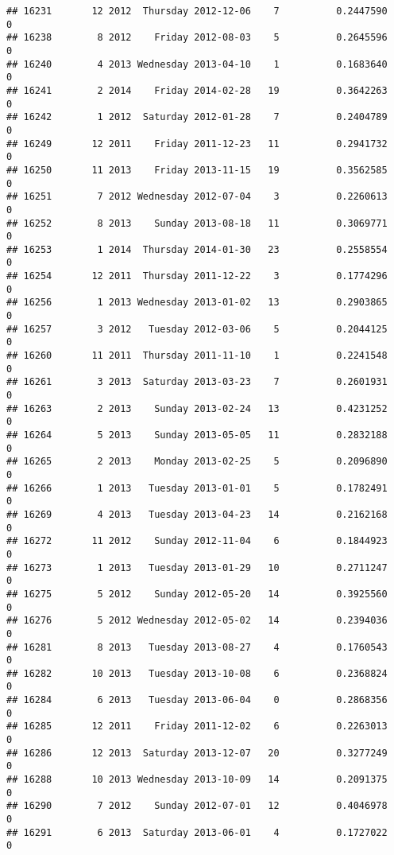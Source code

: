 \documentclass[
]{article}
\begin{document}
\begin{verbatim}
## 16231       12 2012  Thursday 2012-12-06    7          0.2447590             0
## 16238        8 2012    Friday 2012-08-03    5          0.2645596             0
## 16240        4 2013 Wednesday 2013-04-10    1          0.1683640             0
## 16241        2 2014    Friday 2014-02-28   19          0.3642263             0
## 16242        1 2012  Saturday 2012-01-28    7          0.2404789             0
## 16249       12 2011    Friday 2011-12-23   11          0.2941732             0
## 16250       11 2013    Friday 2013-11-15   19          0.3562585             0
## 16251        7 2012 Wednesday 2012-07-04    3          0.2260613             0
## 16252        8 2013    Sunday 2013-08-18   11          0.3069771             0
## 16253        1 2014  Thursday 2014-01-30   23          0.2558554             0
## 16254       12 2011  Thursday 2011-12-22    3          0.1774296             0
## 16256        1 2013 Wednesday 2013-01-02   13          0.2903865             0
## 16257        3 2012   Tuesday 2012-03-06    5          0.2044125             0
## 16260       11 2011  Thursday 2011-11-10    1          0.2241548             0
## 16261        3 2013  Saturday 2013-03-23    7          0.2601931             0
## 16263        2 2013    Sunday 2013-02-24   13          0.4231252             0
## 16264        5 2013    Sunday 2013-05-05   11          0.2832188             0
## 16265        2 2013    Monday 2013-02-25    5          0.2096890             0
## 16266        1 2013   Tuesday 2013-01-01    5          0.1782491             0
## 16269        4 2013   Tuesday 2013-04-23   14          0.2162168             0
## 16272       11 2012    Sunday 2012-11-04    6          0.1844923             0
## 16273        1 2013   Tuesday 2013-01-29   10          0.2711247             0
## 16275        5 2012    Sunday 2012-05-20   14          0.3925560             0
## 16276        5 2012 Wednesday 2012-05-02   14          0.2394036             0
## 16281        8 2013   Tuesday 2013-08-27    4          0.1760543             0
## 16282       10 2013   Tuesday 2013-10-08    6          0.2368824             0
## 16284        6 2013   Tuesday 2013-06-04    0          0.2868356             0
## 16285       12 2011    Friday 2011-12-02    6          0.2263013             0
## 16286       12 2013  Saturday 2013-12-07   20          0.3277249             0
## 16288       10 2013 Wednesday 2013-10-09   14          0.2091375             0
## 16290        7 2012    Sunday 2012-07-01   12          0.4046978             0
## 16291        6 2013  Saturday 2013-06-01    4          0.1727022             0

\end{verbatim}
\end{document}
